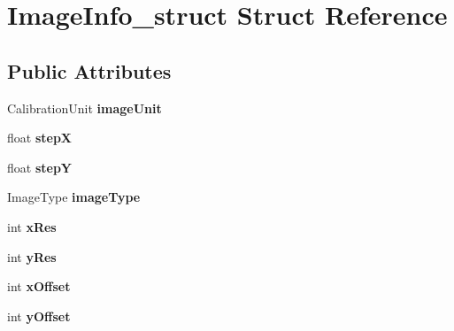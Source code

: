 \hypertarget{structImageInfo__struct}{\section{\-Image\-Info\-\_\-struct \-Struct \-Reference}
\label{structImageInfo__struct}
}
\subsection*{\-Public \-Attributes}
\begin{DoxyCompactItemize}
\item 
\hypertarget{structImageInfo__struct_a2a1a4b0989752555e25cbe9bc4d8499b}{\-Calibration\-Unit {\bfseries image\-Unit}}\label{structImageInfo__struct_a2a1a4b0989752555e25cbe9bc4d8499b}

\item 
\hypertarget{structImageInfo__struct_ac42a36590e35b1530263caaa7423cd8b}{float {\bfseries step\-X}}\label{structImageInfo__struct_ac42a36590e35b1530263caaa7423cd8b}

\item 
\hypertarget{structImageInfo__struct_a423c8c3e3c85ba39f6e9855083e05006}{float {\bfseries step\-Y}}\label{structImageInfo__struct_a423c8c3e3c85ba39f6e9855083e05006}

\item 
\hypertarget{structImageInfo__struct_aa03d23eb7acc971f3be17f0589b82248}{\-Image\-Type {\bfseries image\-Type}}\label{structImageInfo__struct_aa03d23eb7acc971f3be17f0589b82248}

\item 
\hypertarget{structImageInfo__struct_acaef5cb1ec4956ac0ae4b06a465502d9}{int {\bfseries x\-Res}}\label{structImageInfo__struct_acaef5cb1ec4956ac0ae4b06a465502d9}

\item 
\hypertarget{structImageInfo__struct_af9a48c8d14020669fb440d1dd5e6199a}{int {\bfseries y\-Res}}\label{structImageInfo__struct_af9a48c8d14020669fb440d1dd5e6199a}

\item 
\hypertarget{structImageInfo__struct_a624e1267359590053aa2b1bab9cc9afc}{int {\bfseries x\-Offset}}\label{structImageInfo__struct_a624e1267359590053aa2b1bab9cc9afc}

\item 
\hypertarget{structImageInfo__struct_ae8a4ed52e0fa780296e9ba40e71ac212}{int {\bfseries y\-Offset}}\label{structImageInfo__struct_ae8a4ed52e0fa780296e9ba40e71ac212}


\end{DoxyCompactItemize}
